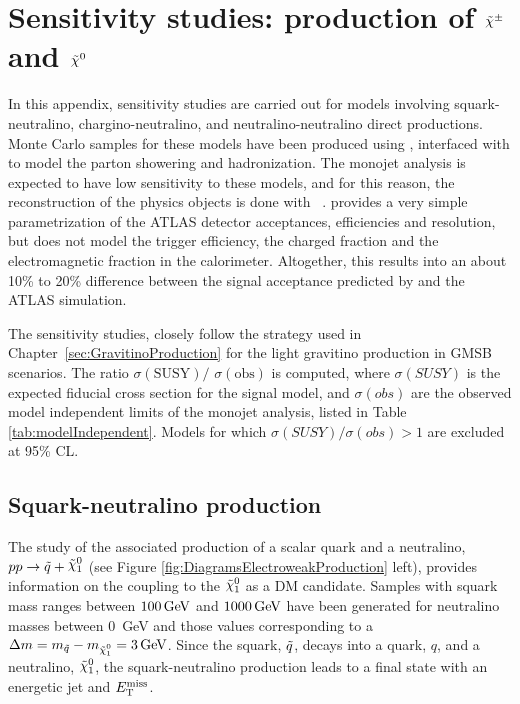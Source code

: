 \chapter{Sensitivity studies: production of $\chinopm$ and $\nino$}
    \label{sec:CharginoNeutralinoProduction}

In this appendix, sensitivity studies are carried out for models involving squark-neutralino, chargino-neutralino, and neutralino-neutralino direct productions.
Monte Carlo samples for these models have been produced using \madgraph{}, interfaced with \pythia{} to model the parton showering and hadronization.
The monojet analysis is expected to have low sensitivity to these models, and for this reason, the reconstruction of the physics objects is done with \delphes{}~\cite{Ovyn:2009tx}.
\delphes{} provides a very simple parametrization of the ATLAS detector acceptances, efficiencies and resolution, but does not model the trigger efficiency, the charged fraction and the electromagnetic fraction in the calorimeter.
Altogether, this results into an about 10\% to 20\% difference between the signal acceptance predicted by \delphes{} and the ATLAS simulation.

The sensitivity studies, closely follow the strategy used in Chapter~\ref{sec:GravitinoProduction} for the light gravitino production in GMSB scenarios.
The ratio $\sigma(\text{SUSY})/$ $\sigma(\text{obs})$ is computed, where $\sigma (SUSY)$ is the expected fiducial cross section for the signal model, and $\sigma (obs)$ are the observed model independent limits of the monojet analysis, listed in Table \ref{tab:modelIndependent}.
Models for which $\sigma (SUSY) / \sigma (obs) > 1$ are excluded at 95\% CL.


\section{Squark-neutralino production}
    \label{subsec:SquarkNeutralinoProduction}

The study of the associated production of a scalar quark and a neutralino, $\squarkneutralino$ (see Figure \ref{fig:DiagramsElectroweakProduction} left), provides information on the coupling to the $\ninoone$ as a DM candidate.
Samples with squark mass ranges between $\unit[100]{GeV}$ and $\unit[1000]{GeV}$ have been generated for neutralino masses between 0~GeV and those values corresponding to a $\Delta m = m_{\squark} - m_{\ninoone} = \unit[3]{GeV}$.
Since the squark, $\tilde{q}$, decays into a quark, $q$, and a neutralino, $ \ninoone$, the squark-neutralino production leads to a final state with an energetic jet and $E_{\mathrm{T}}^{\mathrm{miss}}$.

